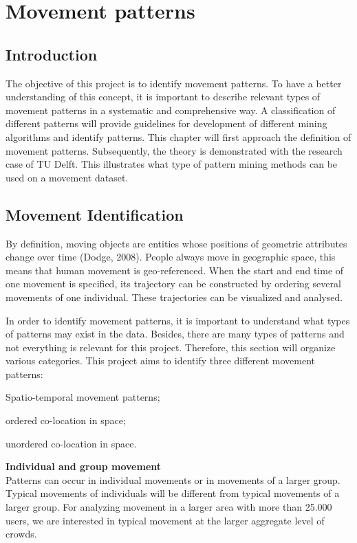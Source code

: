 \chapter{Movement patterns}\label{movementpatterns}

\section{Introduction}
The objective of this project is to identify movement patterns. To have a better understanding of this concept, it is important to describe relevant types of movement patterns in a systematic and comprehensive way. A classification of different patterns will provide guidelines for development of different mining algorithms and identify patterns. This chapter will first approach the definition of movement patterns. Subsequently, the theory is demonstrated with the research case of TU Delft. This illustrates what type of pattern mining methods can be used on a movement dataset. 

\section{Movement Identification}
By definition, moving objects are entities whose positions of geometric attributes change over time (Dodge, 2008). People always move in geographic space, this means that human movement is geo-referenced. When the start and end time of one movement is specified, its trajectory can be constructed by ordering several movements of one individual. These trajectories can be visualized and analysed.

In order to identify movement patterns, it is important to understand what types of patterns may exist in the data. Besides, there are many types of patterns and not everything is relevant for this project. Therefore, this section will organize various categories. This project aims to identify three different movement patterns: \begin {enumerate*} [label=\itshape\arabic*\upshape),font={\color{red!0!black}\bfseries}] \item Spatio-temporal movement patterns; \item ordered co-location in space; \item unordered co-location in space.
\end {enumerate*}

\textbf{Individual and group movement}\\
Patterns can occur in individual movements or in movements of a larger group. Typical movements of individuals will be different from typical movements of a larger group. For analyzing movement in a larger area with more than 25.000 users, we are interested in typical movement at the larger aggregate level of crowds. 

